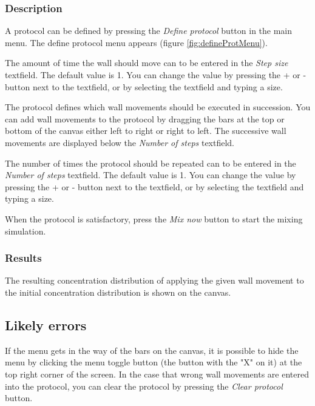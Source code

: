 \subsubsection{Description}
A protocol can be defined by pressing the \emph{Define protocol} button in the main menu. The define protocol menu appears (figure \ref{fig:defineProtMenu}).


The amount of time the wall should move can to be entered in the \emph{Step size} textfield. The default value is 1. You can change the value by pressing the + or - button next to the textfield, or by selecting the textfield and typing a size.

The protocol defines which wall movements should be executed in succession. You can add wall movements to the protocol by dragging the bars at the top or bottom of the canvas either left to right or right to left. The successive wall movements are displayed below the \emph{Number of steps} textfield.

The number of times the protocol should be repeated can to be entered in the \emph{Number of steps} textfield. The default value is 1. You can change the value by pressing the + or - button next to the textfield, or by selecting the textfield and typing a size.

When the protocol is satisfactory, press the \emph{Mix now} button to start the mixing simulation.

\subsubsection{Results}
The resulting concentration distribution of applying the given wall movement to the initial concentration distribution is shown on the canvas.

\subsection{Likely errors}
If the menu gets in the way of the bars on the canvas, it is possible to hide the menu by clicking the menu toggle button (the button with the "X" on it) at the top right corner of the screen. In the case that wrong wall movements are entered into the protocol, you can clear the protocol by pressing the \emph{Clear protocol} button.


